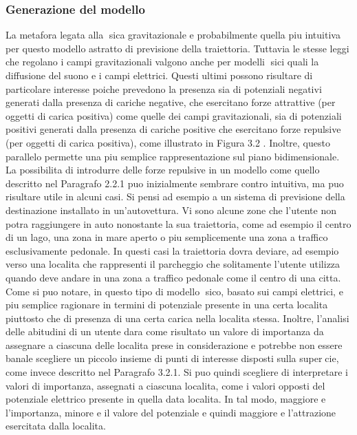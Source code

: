 \subsubsection{Generazione del modello}
La metafora legata alla sica gravitazionale e probabilmente quella piu intuitiva
per questo modello astratto di previsione della traiettoria. Tuttavia le
stesse leggi che regolano i campi gravitazionali valgono anche per modelli sici
quali la diffusione del suono e i campi elettrici. Questi ultimi possono risultare
di particolare interesse poiche prevedono la presenza sia di potenziali negativi
generati dalla presenza di cariche negative, che esercitano forze attrattive (per
oggetti di carica positiva) come quelle dei campi gravitazionali, sia di potenziali
positivi generati dalla presenza di cariche positive che esercitano forze
repulsive (per oggetti di carica positiva), come illustrato in Figura 3.2 . Inoltre,
questo parallelo permette una piu semplice rappresentazione sul piano
bidimensionale.\\
La possibilita di introdurre delle forze repulsive in un modello come quello
descritto nel Paragrafo 2.2.1 puo inizialmente sembrare contro intuitiva, ma
puo risultare utile in alcuni casi. Si pensi ad esempio a un sistema di previsione
della destinazione installato in un'autovettura. Vi sono alcune zone che l'utente
non potra raggiungere in auto nonostante la sua traiettoria, come ad esempio
il centro di un lago, una zona in mare aperto o piu semplicemente una zona
a traffico esclusivamente pedonale. In questi casi la traiettoria dovra deviare,
ad esempio verso una localita che rappresenti il parcheggio che solitamente
l'utente utilizza quando deve andare in una zona a traffico pedonale come il
centro di una citta.\\
Come si puo notare, in questo tipo di modello sico, basato sui campi
elettrici, e piu semplice ragionare in termini di potenziale presente in una
certa localita piuttosto che di presenza di una certa carica nella localita stessa.
Inoltre, l'analisi delle abitudini di un utente dara come risultato un valore di
importanza da assegnare a ciascuna delle localita prese in considerazione e
potrebbe non essere banale scegliere un piccolo insieme di punti di interesse
disposti sulla supercie, come invece descritto nel Paragrafo 3.2.1. Si puo
quindi scegliere di interpretare i valori di importanza, assegnati a ciascuna
localita, come i valori opposti del potenziale elettrico presente in quella data
localita. In tal modo, maggiore e l'importanza, minore e il valore del potenziale
e quindi maggiore e l'attrazione esercitata dalla localita.

